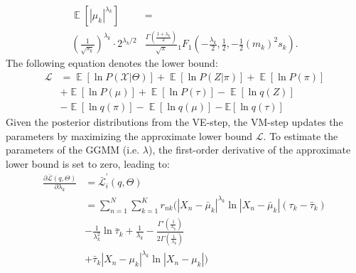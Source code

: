 \documentclass[conference]{IEEEtran}
\begin{document}
    
    \begin{equation}
        \begin{split}
            \displaystyle \operatorname {\mathbb{E}} \left[|\mu_k|^{\lambda_k}\right]&=\\
            (\frac{1}{\sqrt{s_k}})^{\lambda_k}\cdot 2^{\lambda_k/2}&{\frac {\Gamma \left({\frac {1+\lambda_k}{2}}\right)}{\sqrt {\pi }}}
            {}_{1}F_{1}\left(-{\frac {\lambda_k}{2}},{\frac {1}{2}},-{\frac {1}{2}}\left({m_k}\right)^{2} s_k \right).  
        \end{split}
    \end{equation}
    The following equation denotes the lower bound:
    \begin{equation}
        \begin{split}\label{lowerbound}
         \mathcal{L}&= \mathop{\mathbb{E}}[\ln P(\mathcal{X}|\Theta)] + \mathop{\mathbb{E}}[\ln P(Z|\pi)] +\mathop{\mathbb{E}}[\ln P(\pi)]\\
        &+ \mathop{\mathbb{E}}[\ln P(\mu)]+\mathop{\mathbb{E}}[\ln P(\tau)] -\mathop{\mathbb{E}}[\ln q(Z)]\\
        &-\mathop{\mathbb{E}}[\ln q(\pi)]-\mathop{\mathbb{E}}[\ln q(\mu)]-\mathbb{E}[\ln q(\tau)]
        \end{split}
        \end{equation}
        Given the posterior distributions from the VE-step, the VM-step updates the parameters by maximizing the approximate lower bound $\mathcal{L}$.
        To estimate the parameters of the GGMM (i.e. $\lambda$), the first-order derivative of the approximate lower bound is set to zero, leading to:
        \begin{equation}
            \begin{split}
                \frac{\partial \bar{\mathcal{L}}(q, \Theta)}{\partial \lambda_k} &= \bar{\mathcal{L}}_i^{'}(q, \Theta)\\
                &=\sum_{n=1}^{N}\sum_{k=1}^{K} r_{nk}(|X_n - \bar{\mu}_k|^{\lambda_k} \ln |X_n - \bar{\mu}_k|(\tau_k - \bar{\tau}_k) \\
                &- \frac{1}{\lambda_k^2} \ln \bar{\tau}_k + \frac{1}{\lambda_k} - \frac{\Gamma'(\frac{1}{\lambda_k})}{2\Gamma(\frac{1}{\lambda_k})} \\
                &+ \bar{\tau}_k|X_n - \mu_k|^{\lambda_k} \ln |X_n - \mu_k|)
            \end{split}
        \end{equation}
\end{document}
